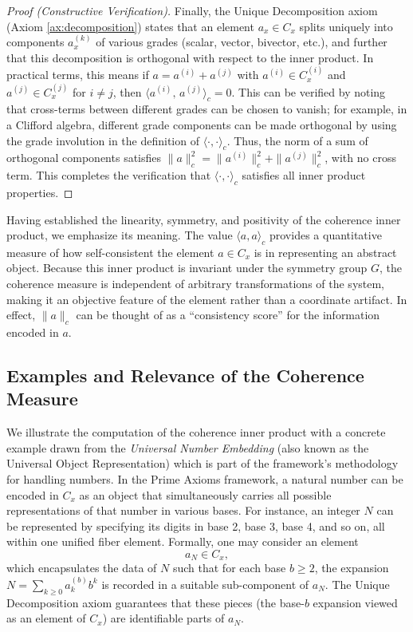 \documentclass[11pt]{article}
\begin{document}
\begin{proof}[Proof (Constructive Verification)]
Finally, the Unique Decomposition axiom (Axiom \ref{ax:decomposition}) states that an element $a_x \in C_x$ splits uniquely into components $a_x^{(k)}$ of various grades (scalar, vector, bivector, etc.), and further that this decomposition is orthogonal with respect to the inner product. In practical terms, this means if $a = a^{(i)} + a^{(j)}$ with $a^{(i)}\in C_x^{(i)}$ and $a^{(j)}\in C_x^{(j)}$ for $i\neq j$, then $\langle a^{(i)},\,a^{(j)}\rangle_c = 0$. This can be verified by noting that cross-terms between different grades can be chosen to vanish; for example, in a Clifford algebra, different grade components can be made orthogonal by using the grade involution in the definition of $\langle\cdot,\cdot\rangle_c$. Thus, the norm of a sum of orthogonal components satisfies $\|a\|_c^2 = \|a^{(i)}\|_c^2 + \|a^{(j)}\|_c^2$, with no cross term. This completes the verification that $\langle\cdot,\cdot\rangle_c$ satisfies all inner product properties.
\end{proof}

Having established the linearity, symmetry, and positivity of the coherence inner product, we emphasize its meaning. The value $\langle a, a\rangle_c$ provides a quantitative measure of how self-consistent the element $a\in C_x$ is in representing an abstract object. Because this inner product is invariant under the symmetry group $G$, the coherence measure is independent of arbitrary transformations of the system, making it an objective feature of the element rather than a coordinate artifact. In effect, $\|a\|_c$ can be thought of as a ``consistency score'' for the information encoded in $a$.

\subsection*{Examples and Relevance of the Coherence Measure}

We illustrate the computation of the coherence inner product with a concrete example drawn from the \emph{Universal Number Embedding} (also known as the Universal Object Representation) which is part of the framework’s methodology for handling numbers. In the Prime Axioms framework, a natural number can be encoded in $C_x$ as an object that simultaneously carries all possible representations of that number in various bases. For instance, an integer $N$ can be represented by specifying its digits in base 2, base 3, base 4, and so on, all within one unified fiber element. Formally, one may consider an element 
\[ a_N \in C_x, \] 
which encapsulates the data of $N$ such that for each base $b\ge 2$, the expansion $N = \sum_{k\ge0} a_k^{(b)} b^k$ is recorded in a suitable sub-component of $a_N$. The Unique Decomposition axiom guarantees that these pieces (the base-$b$ expansion viewed as an element of $C_x$) are identifiable parts of $a_N$.
\end{document}
